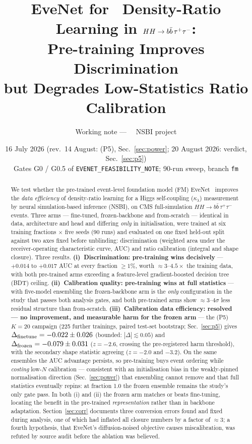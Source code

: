 \documentclass[11pt]{article}
\title{EveNet for \kl\ Density-Ratio Learning in $HH\to\bbtt$:\\
Pre-training Improves Discrimination\\
but Degrades Low-Statistics Ratio Calibration}
\author{Working note --- \bbtt\ \kl\ NSBI project}
\date{16 July 2026 (rev.\ 14 August: (P5), Sec.~\ref{sec:power};
20 August 2026: verdict, Sec.~\ref{sec:p5}) \\[2pt]
\small Gates G0 / G0.5 of \texttt{EVENET\_FEASIBILITY\_NOTE}; 90-run sweep, branch \texttt{fm}}
\newcommand{\kl}{\ensuremath{\kappa_\lambda}}
\newcommand{\bbtt}{\ensuremath{b\bar b\,\tau^+\tau^-}}
\begin{document}
\maketitle

\begin{abstract}
\noindent
We test whether the pre-trained event-level foundation model (FM)
EveNet~\cite{Hsu:2026evenet} improves the \emph{data efficiency} of density-ratio learning
for a Higgs self-coupling (\kl) measurement by neural simulation-based inference (NSBI),
on CMS full-simulation $HH\to\bbtt$ events. Three arms --- fine-tuned, frozen-backbone and
from-scratch --- identical in data, architecture and head and differing \emph{only} in
initialisation, were trained at six training fractions $\times$ five seeds (90 runs) and
evaluated on one fixed held-out split against two axes fixed before unblinding:
discrimination (weighted area under the receiver-operating characteristic curve, AUC) and
ratio calibration (integral and shape closure). Three results. \textbf{(i)~Discrimination:
pre-training wins decisively} --- $+0.014$ to $+0.017$ AUC at every fraction $\ge 1\%$, worth
${\approx}3$--$4.5\times$ the training data, with both pre-trained arms exceeding a
feature-level gradient-boosted decision tree (BDT) ceiling. \textbf{(ii)~Calibration
quality: pre-training wins at full statistics} --- with five-model ensembling the
frozen-backbone arm is the \emph{only} configuration in the study that passes both analysis
gates, and both pre-trained arms show ${\approx}3$--$4\sigma$ less residual structure than
from-scratch. \textbf{(iii)~Calibration data efficiency: resolved --- no improvement, and measurable harm
for the frozen arm} --- the (P5) $K{=}20$ campaign (225 further trainings, paired
test-set bootstrap; Sec.~\ref{sec:p5}) gives
$\Delta_{\rm finetune} = -0.022 \pm 0.026$ (bounded: $|\Delta| \lesssim 0.05$) and
$\Delta_{\rm frozen} = -0.079 \pm 0.031$ ($z = -2.6$, crossing the pre-registered harm
threshold), with the secondary shape statistic agreeing ($z = -2.0$ and $-3.2$). On the
same ensembles the AUC advantage persists, so pre-training buys event ordering while
\emph{costing} low-$N$ calibration --- consistent with an initialisation bias in the
weakly-pinned normalisation direction (Sec.~\ref{sec:power}) that ensembling cannot
remove and that full statistics eventually repins: at fraction 1.0 the frozen ensemble
remains the study's only gate pass. In
both (i) and (ii) the frozen arm matches or beats fine-tuning, locating the benefit in the
pre-trained \emph{representation} rather than in backbone adaptation. Section~\ref{sec:corr}
documents three conversion errors found and fixed during analysis, one of which had
inflated all closure numbers by a factor of ${\approx}3$; a fourth hypothesis, that
EveNet's diffusion-noised objective causes miscalibration, was refuted by source audit
before the ablation was believed.
\end{abstract}
\end{document}
